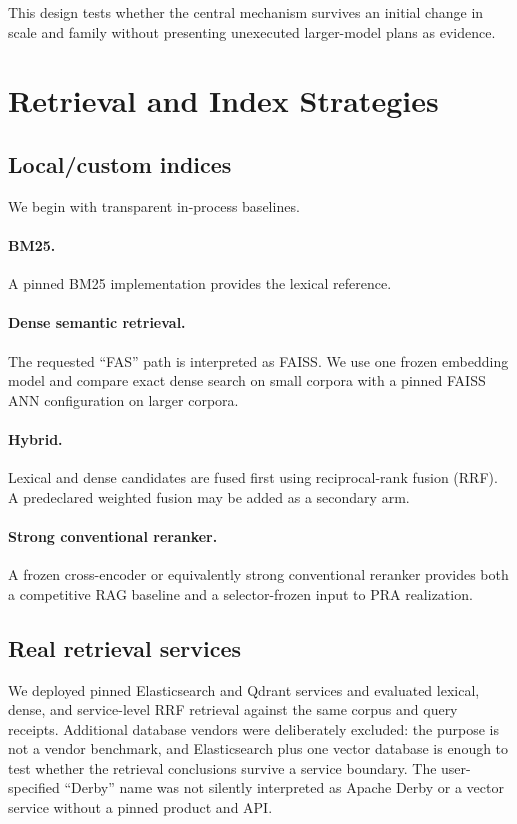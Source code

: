 \documentclass[11pt]{article}
\begin{document}
This design tests whether the central mechanism survives an initial change in
scale and family without presenting unexecuted larger-model plans as evidence.

\section{Retrieval and Index Strategies}

\subsection{Local/custom indices}
We begin with transparent in-process baselines.

\paragraph{BM25.}
A pinned BM25 implementation provides the lexical reference.

\paragraph{Dense semantic retrieval.}
The requested ``FAS'' path is interpreted as FAISS.  We use one frozen embedding model and compare exact dense search on small corpora with a pinned FAISS ANN configuration on larger corpora.

\paragraph{Hybrid.}
Lexical and dense candidates are fused first using reciprocal-rank fusion (RRF).  A predeclared weighted fusion may be added as a secondary arm.

\paragraph{Strong conventional reranker.}
A frozen cross-encoder or equivalently strong conventional reranker provides both a competitive RAG baseline and a selector-frozen input to PRA realization.

\subsection{Real retrieval services}
We deployed pinned Elasticsearch and Qdrant services and evaluated lexical,
dense, and service-level RRF retrieval against the same corpus and query
receipts. Additional database vendors were deliberately excluded: the purpose
is not a vendor benchmark, and Elasticsearch plus one vector database is enough
to test whether the retrieval conclusions survive a service boundary. The
user-specified ``Derby'' name was not silently interpreted as Apache Derby or a
vector service without a pinned product and API.
\end{document}
